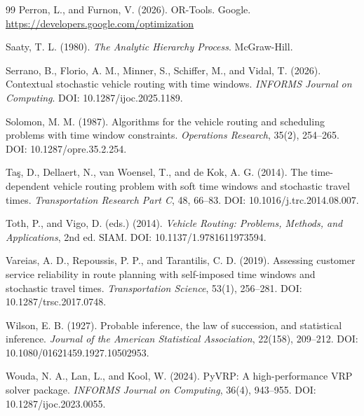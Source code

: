 \documentclass[11pt,a4paper]{article}
\begin{document}
\begin{thebibliography}{99}
Perron, L., and Furnon, V. (2026). OR-Tools. Google.
\url{https://developers.google.com/optimization}

Saaty, T. L. (1980). \emph{The Analytic Hierarchy Process}. McGraw-Hill.

Serrano, B., Florio, A. M., Minner, S., Schiffer, M., and Vidal, T. (2026).
Contextual stochastic vehicle routing with time windows.
\emph{INFORMS Journal on Computing}. DOI: 10.1287/ijoc.2025.1189.

Solomon, M. M. (1987). Algorithms for the vehicle routing and scheduling
problems with time window constraints. \emph{Operations Research}, 35(2),
254--265. DOI: 10.1287/opre.35.2.254.

Ta\c{s}, D., Dellaert, N., van Woensel, T., and de Kok, A. G. (2014). The
time-dependent vehicle routing problem with soft time windows and stochastic
travel times. \emph{Transportation Research Part C}, 48, 66--83. DOI:
10.1016/j.trc.2014.08.007.

Toth, P., and Vigo, D. (eds.) (2014). \emph{Vehicle Routing: Problems, Methods,
and Applications}, 2nd ed. SIAM. DOI: 10.1137/1.9781611973594.

Vareias, A. D., Repoussis, P. P., and Tarantilis, C. D. (2019). Assessing
customer service reliability in route planning with self-imposed time windows
and stochastic travel times. \emph{Transportation Science}, 53(1), 256--281.
DOI: 10.1287/trsc.2017.0748.

Wilson, E. B. (1927). Probable inference, the law of succession, and
statistical inference. \emph{Journal of the American Statistical Association},
22(158), 209--212. DOI: 10.1080/01621459.1927.10502953.

Wouda, N. A., Lan, L., and Kool, W. (2024). PyVRP: A high-performance VRP
solver package. \emph{INFORMS Journal on Computing}, 36(4), 943--955. DOI:
10.1287/ijoc.2023.0055.

\end{thebibliography}
\endgroup
\end{document}
